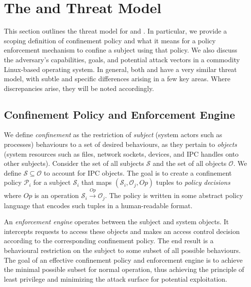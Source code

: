 \section{The \bpfbox{} and \bpfcontain{} Threat Model}%
\label{s:cp-threat-model}

This section outlines the threat model for \bpfbox{} and \bpfcontain{}. In particular, we
provide a scoping definition of confinement policy and what it means for a policy
enforcement mechanism to confine a subject using that policy. We also discuss the
adversary's capabilities, goals, and potential attack vectors in a commodity Linux-based
operating system. In general, both \bpfbox{} and \bpfcontain{} have a very similar threat
model, with subtle and specific differences arising in a few key areas. Where
discrepancies arise, they will be noted accordingly.

\subsection{Confinement Policy and Enforcement Engine}

We define \textit{confinement} as the restriction of \textit{subject} (system actors such
as processes) behaviours to a set of desired behaviours, as they pertain to
\textit{objects} (system resources such as files, network sockets, devices, and IPC
handles onto other subjects). Consider the set of all subjects $\mathcal{S}$ and the set
of all objects $\mathcal{O}$. We define $\mathcal{S} \subseteq \mathcal{O}$ to account for
IPC objects. The goal is to create a confinement policy $\mathcal{P}_i$ for a subject
$\mathcal{S}_i$ that maps $(\mathcal{S}_i, \mathcal{O}_j, Op)$ tuples to \textit{policy
decisions} where $Op$ is an operation $\mathcal{S}_i \xrightarrow{Op} \mathcal{O}_j$.  The
policy is written in some abstract policy language that encodes such tuples in
a human-readable format.

An \textit{enforcement engine} operates between the subject and system objects. It
intercepts requests to access these objects and makes an access control decision according
to the corresponding confinement policy. The end result is a behavioural restriction on
the subject to some subset of all possible behaviours. The goal of an effective
confinement policy and enforcement engine is to achieve the minimal possible subset for
normal operation, thus achieving the principle of least privilege and minimizing the
attack surface for potential exploitation.

